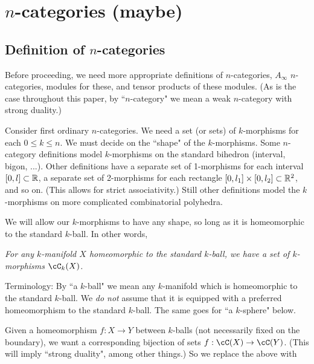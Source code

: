 
\def\xxpar#1#2{\smallskip\noindent{\bf #1} {\it #2} \smallskip}

\section{$n$-categories (maybe)}
\label{sec:ncats}


\subsection{Definition of $n$-categories}

Before proceeding, we need more appropriate definitions of $n$-categories, 
$A_\infty$ $n$-categories, modules for these, and tensor products of these modules.
(As is the case throughout this paper, by ``$n$-category" we mean
a weak $n$-category with strong duality.)

Consider first ordinary $n$-categories.
We need a set (or sets) of $k$-morphisms for each $0\le k \le n$.
We must decide on the ``shape" of the $k$-morphisms.
Some $n$-category definitions model $k$-morphisms on the standard bihedron (interval, bigon, ...).
Other definitions have a separate set of 1-morphisms for each interval $[0,l] \subset \mathbb{R}$, 
a separate set of 2-morphisms for each rectangle $[0,l_1]\times [0,l_2] \subset \mathbb{R}^2$,
and so on.
(This allows for strict associativity.)
Still other definitions 
model the $k$-morphisms on more complicated combinatorial polyhedra.

We will allow our $k$-morphisms to have any shape, so long as it is homeomorphic to 
the standard $k$-ball.
In other words,

\xxpar{Morphisms (preliminary version):}
{For any $k$-manifold $X$ homeomorphic 
to the standard $k$-ball, we have a set of $k$-morphisms
$\cC_k(X)$.}

Terminology: By ``a $k$-ball" we mean any $k$-manifold which is homeomorphic to the 
standard $k$-ball.
We {\it do not} assume that it is equipped with a 
preferred homeomorphism to the standard $k$-ball.
The same goes for ``a $k$-sphere" below.


Given a homeomorphism $f:X\to Y$ between $k$-balls (not necessarily fixed on 
the boundary), we want a corresponding
bijection of sets $f:\cC(X)\to \cC(Y)$.
(This will imply ``strong duality", among other things.)
So we replace the above with

